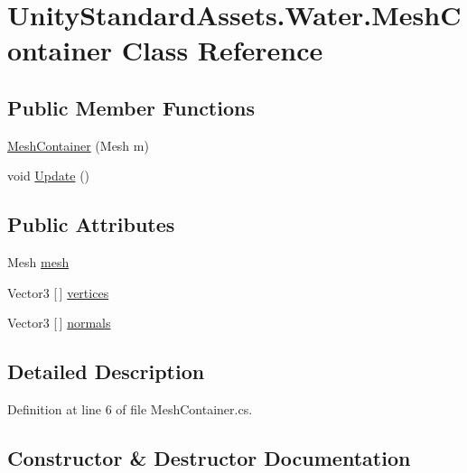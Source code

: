 \hypertarget{class_unity_standard_assets_1_1_water_1_1_mesh_container}{}\section{Unity\+Standard\+Assets.\+Water.\+Mesh\+Container Class Reference}
\label{class_unity_standard_assets_1_1_water_1_1_mesh_container}
\subsection*{Public Member Functions}
\begin{DoxyCompactItemize}
\item 
\mbox{\hyperlink{class_unity_standard_assets_1_1_water_1_1_mesh_container_ab3954cf99b38ff6e490b3fdd5f70e8d3}{Mesh\+Container}} (Mesh m)
\item 
void \mbox{\hyperlink{class_unity_standard_assets_1_1_water_1_1_mesh_container_a7d085fdd2ba5e0f4372715ac24ab9600}{Update}} ()
\end{DoxyCompactItemize}
\subsection*{Public Attributes}
\begin{DoxyCompactItemize}
\item 
Mesh \mbox{\hyperlink{class_unity_standard_assets_1_1_water_1_1_mesh_container_a58588088068a9018408b031d1cd49ba6}{mesh}}
\item 
Vector3 \mbox{[}$\,$\mbox{]} \mbox{\hyperlink{class_unity_standard_assets_1_1_water_1_1_mesh_container_ab5e8bdf3abb08789b1aff3ee38f1922d}{vertices}}
\item 
Vector3 \mbox{[}$\,$\mbox{]} \mbox{\hyperlink{class_unity_standard_assets_1_1_water_1_1_mesh_container_a954d32b18a55d83289fa567d17f28bdc}{normals}}
\end{DoxyCompactItemize}


\subsection{Detailed Description}


Definition at line 6 of file Mesh\+Container.\+cs.



\subsection{Constructor \& Destructor Documentation}
\mbox{\label{class_unity_standard_assets_1_1_water_1_1_mesh_container_ab3954cf99b38ff6e490b3fdd5f70e8d3}} 
